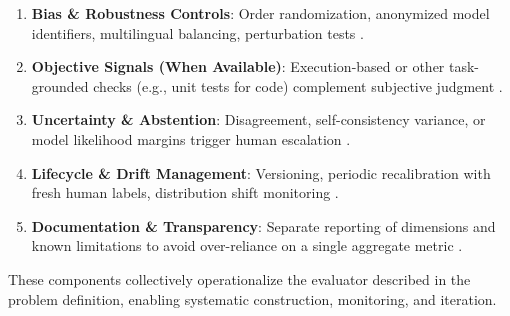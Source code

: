 \begin{enumerate}
	\item \textbf{Bias \& Robustness Controls}: Order randomization, anonymized model identifiers, multilingual balancing, perturbation tests \cite{zheng2023judgelm, hada2024metal, liang2022helm}.
	\item \textbf{Objective Signals (When Available)}: Execution-based or other task-grounded checks (e.g., unit tests for code) complement subjective judgment \cite{chen2021evaluating, li2024_llmsasjudges}.
	\item \textbf{Uncertainty \& Abstention}: Disagreement, self-consistency variance, or model likelihood margins trigger human escalation \cite{bavaresco2024judgebench, li2024_llmsasjudges}.
	\item \textbf{Lifecycle \& Drift Management}: Versioning, periodic recalibration with fresh human labels, distribution shift monitoring \cite{liang2022helm, li2024_llmsasjudges}.
	\item \textbf{Documentation \& Transparency}: Separate reporting of dimensions and known limitations to avoid over-reliance on a single aggregate metric \cite{liang2022helm, bavaresco2024judgebench}.
\end{enumerate} %

These components collectively operationalize the evaluator described in the problem definition, enabling systematic construction, monitoring, and iteration.